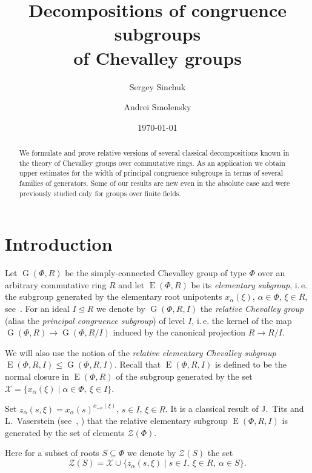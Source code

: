 \documentclass[oneside, 12pt]{amsart}
\title [Decompositions of congruence subgroups of Chevalley groups] {Decompositions of congruence subgroups \\ of Chevalley groups}
\author{Sergey Sinchuk}
\author{Andrei Smolensky}
\date {\today}
\theoremstyle{plain}
\numberwithin{equation}{section}
\numberwithin{lemma}{section}
\theoremstyle{definition}
\theoremstyle{remark}
\DeclareMathOperator{\G}{G}
\DeclareMathOperator{\E}{E}
\begin{document}
\begin{abstract} 
We formulate and prove relative versions of several classical decompositions known in the theory of Chevalley groups over commutative rings. %
As an application we obtain upper estimates for the width of principal congruence subgroups in terms of several families of generators.
Some of our results are new even in the absolute case and were previously studied only for groups over finite fields.
\end{abstract}

\maketitle

\section{Introduction}\label{sec:intro}
Let $\G(\Phi, R)$ be the simply-connected Chevalley group of type $\Phi$ over an arbitrary commutative ring $R$ and let $\E(\Phi, R)$ be its \emph{elementary subgroup},
i.\,e. the subgroup generated by the elementary root unipotents $x_\alpha(\xi)$, $\alpha\in\Phi$, $\xi\in R$, see~\cite{VP, St78, S}.
For an ideal $I \trianglelefteq R$ we denote by $\G(\Phi, R, I)$ the \emph{relative Chevalley group} (alias the \emph{principal congruence subgroup}) of level $I$, 
i.\,e. the kernel of the map $\G(\Phi, R)\rightarrow\G(\Phi, R/I)$ induced by the canonical projection $R\rightarrow R/I$.

We will also use the notion of the \emph{relative elementary Chevalley subgroup} $\E(\Phi, R, I) \leqslant \G(\Phi, R, I)$.
Recall that $\E(\Phi, R, I)$ is defined to be the normal closure in $\E(\Phi, R)$ of the subgroup generated by the set $\mathcal{X} = \{x_\alpha(\xi) \mid \alpha\in \Phi, \ \xi \in I \}$.

Set $z_\alpha(s, \xi) = x_{\alpha}(s)^{x_{-\alpha}(\xi)}$, $s\in I$, $\xi\in R$.
It is a classical result of J.~Tits and L.~Vaserstein (see~\cite{Tits76}, \cite[Theorem~2]{Va86}) that the relative elementary subgroup $\E(\Phi, R, I)$ is generated by
the set of elements $\mathcal{Z}(\Phi)$.

Here for a subset of roots $S\subseteq\Phi$ we denote by $\mathcal{Z}(S)$ the set
\[ \mathcal{Z}(S) =  \mathcal{X} \cup \{ z_\alpha(s, \xi) \mid s\in I, \ \xi \in R, \ \alpha \in S\}.\]
\end{document}
